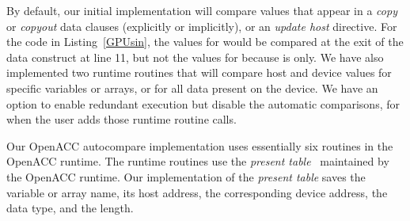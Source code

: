 By default, our initial implementation will compare values that appear in a \emph{copy} or \emph{copyout} data clauses (explicitly or implicitly), or an \emph{update host} directive.
For the code in Listing~\ref{GPUsin}, the values for  would be compared at the exit of the data construct at line 11, but not the values for  because  is  only.
We have also implemented two runtime routines that will compare host and device values for specific variables or arrays, or for all data present on the device.
We have an option to enable redundant execution but disable the automatic comparisons, for when the user adds those runtime routine calls.



Our OpenACC autocompare implementation uses essentially six routines in the OpenACC runtime.
The runtime routines use the \emph{present table}~\cite{wolfe.ashes.17} maintained by the OpenACC runtime.
Our implementation of the \emph{present table} saves the variable or array name, its host address, the corresponding device address, the data type, and the length.
